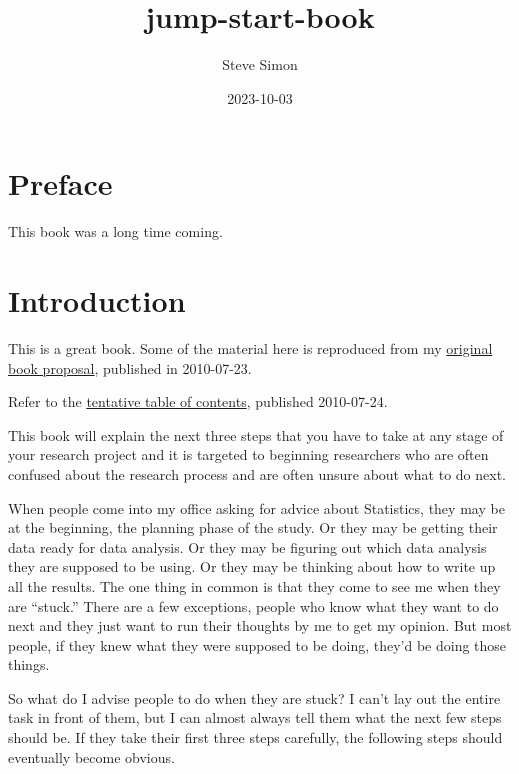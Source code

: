 \documentclass[
  letterpaper,
  DIV=11,
  numbers=noendperiod]{scrreprt}
\title{jump-start-book}
\author{Steve Simon}
\date{2023-10-03}
\renewcommand*\contentsname{Table of contents}
\newcommand\contentsname{Table of contents}
\begin{document}
\maketitle

\renewcommand*\contentsname{Table of contents}
{
\hypersetup{linkcolor=}
\setcounter{tocdepth}{2}
\tableofcontents
}


\chapter*{Preface}\label{preface}


This book was a long time coming.


\chapter{Introduction}\label{introduction}

This is a great book. Some of the material here is reproduced from my
\href{http://www.pmean.com/10/SecondBook.html}{original book proposal},
published in 2010-07-23.

Refer to the \href{http://www.pmean.com/10/Contents.html}{tentative
table of contents}, published 2010-07-24.

This book will explain the next three steps that you have to take at any
stage of your research project and it is targeted to beginning
researchers who are often confused about the research process and are
often unsure about what to do next.

When people come into my office asking for advice about Statistics, they
may be at the beginning, the planning phase of the study. Or they may be
getting their data ready for data analysis. Or they may be figuring out
which data analysis they are supposed to be using. Or they may be
thinking about how to write up all the results. The one thing in common
is that they come to see me when they are ``stuck.'' There are a few
exceptions, people who know what they want to do next and they just want
to run their thoughts by me to get my opinion. But most people, if they
knew what they were supposed to be doing, they'd be doing those things.

So what do I advise people to do when they are stuck? I can't lay out
the entire task in front of them, but I can almost always tell them what
the next few steps should be. If they take their first three steps
carefully, the following steps should eventually become obvious.
\end{document}
